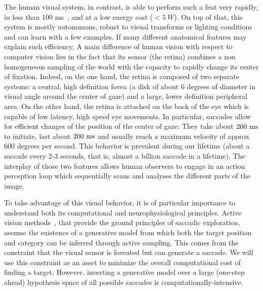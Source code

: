 The human visual system, in contrast, is able to perform such a feat very rapidly, in less than 100 ms~\citep{Kirchner06}, and at a low energy cost ($<5~W$). On top of that, this system is mostly autonomous, robust to visual transforms or lighting conditions and can learn with a few examples. If many different anatomical features may explain such efficiency,  A main difference of human vision with respect to computer vision lies in the fact that its sensor (the retina) combines a non homogeneous sampling of the world with the capacity to rapidly change its center of fixation. Indeed, on the one hand, the retina is composed of two separate systems: a central, high definition fovea (a disk of about 6 degrees of diameter in visual angle around the center of gaze) and a large, lower definition peripheral area. On the other hand, the retina is attached on the back of the eye which is capable of low latency, high speed eye movements.  In particular, saccades allow for efficient changes of the position of the center of gaze: They take about $200~\si{\milli\second}$ to initiate, last about $200~\si{\milli\second}$ and usually reach a maximum velocity of approx 600 degrees per second. This behavior is prevalent during our lifetime (about a saccade every 2-3 seconds, that is, almost a billion saccade in a lifetime).  The interplay of those two features allows human observers to engage in an action perception loop which sequentially scans and analyses the different parts of the image.

To take advantage of this visual behavior, it is of particular importance to understand both its computational and neurophysiological principles.
Active vision methods~\citep{Najemnik05,Butko2010infomax,Friston12}, that provide the ground principles of saccadic exploration, assume the existence of a generative model from which both the target position and category can be inferred through active sampling. This comes from the constraint that the visual sensor is foveated but can generate a saccade. We will use this constraint as an asset to minimize the overall computational cost of finding a target. However, inverting a generative model over a large (one-step ahead) hypothesis space of all possible saccades is computationally-intensive. %



